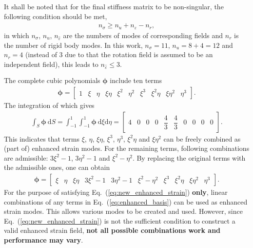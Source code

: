 \documentclass[3p,sort&compress,review,11pt]{elsarticle}
\newcommand*{\md}[1]{\mathrm{d}#1}
\newcommand*{\eqsref}[1]{Eq.~(\ref{#1})}
\newcommand*{\mb}{\bm}
\begin{document}
It shall be noted that for the final stiffness matrix to be non-singular, the following condition should be met,
\begin{gather}
n_\sigma\geqslant{}n_u+n_{\hat{\varepsilon}}-n_r,
\end{gather}
in which $n_\sigma$, $n_u$, $n_{\hat{\varepsilon}}$ are the numbers of modes of corresponding fields and $n_r$ is the number of rigid body modes. In this work, $n_\sigma=11$, $n_u=8+4=12$ and $n_r=4$ (instead of \num{3} due to that the rotation field is assumed to be an independent field), this leads to $n_{\hat{\varepsilon}}\leqslant3$.

The complete cubic polynomials $\mb{\phi}$ include ten terms
\begin{gather*}
\mb{\phi}=\begin{bmatrix}
1&\xi&\eta&\xi\eta&\xi^2&\eta^2&\xi^3&\xi^2\eta&\xi\eta^2&\eta^3
\end{bmatrix}.
\end{gather*}
The integration of which gives
\begin{gather*}
\int_{S}\mb{\phi}~\md{S}=\int_{-1}^{1}\int_{-1}^{1}\mb{\phi}~\md{\xi}\md{\eta}=\begin{bmatrix}
	4 & 0 & 0 & 0 & \dfrac{4}{3} & \dfrac{4}{3} & 0 & 0 & 0 & 0
\end{bmatrix}.
\end{gather*}
This indicates that terms $\xi$, $\eta$, $\xi\eta$, $\xi^3$, $\eta^3$, $\xi^2\eta$ and $\xi\eta^2$ can be freely combined as (part of) enhanced strain modes. For the remaining terms, following combinations are admissible: $3\xi^2-1$, $3\eta^2-1$ and $\xi^2-\eta^2$. By replacing the original terms with the admissible ones, one can obtain
\begin{gather}\label{eq:enhanced_basis}
\mb{\phi}=\left[\begin{array}{cc|cccc|cccc}
\xi&\eta&\xi\eta&3\xi^2-1&3\eta^2-1&\xi^2-\eta^2&\xi^3&\xi^2\eta&\xi\eta^2&\eta^3
\end{array}\right].
\end{gather}
For the purpose of satisfying \eqsref{eq:new_enhanced_strain} \textbf{only}, linear combinations of any terms in \eqsref{eq:enhanced_basis} can be used as enhanced strain modes. This allows various modes to be created and used. However, since  \eqsref{eq:new_enhanced_strain} is not the sufficient condition to construct a valid enhanced strain field, \textbf{not all possible combinations work and performance may vary}.
\end{document}
